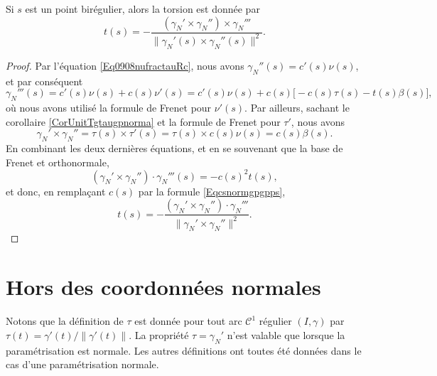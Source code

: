 \begin{proposition}
    Si $s$ est un point birégulier, alors la torsion est donnée par
    \begin{equation}
        t(s)=-\frac{ (\gamma_N'\times \gamma_N'')\times \gamma_N''' }{ \| \gamma_N'(s)\times \gamma_N''(s) \|^2 }.
    \end{equation}
\end{proposition}

\begin{proof}
    Par l'équation \eqref{Eq0908nufractauRc}, nous avons $\gamma_N''(s)=c'(s)\nu(s)$, et par conséquent
    \begin{equation}
        \gamma_N'''(s)=c'(s)\nu(s)+c(s)\nu'(s)=c'(s)\nu(s)+c(s)\big[ -c(s)\tau(s)-t(s)\beta(s) \big],
    \end{equation}
    où nous avons utilisé la formule de Frenet pour $\nu'(s)$. Par ailleurs, sachant le corollaire \ref{CorUnitTgtaugpnorma} et la formule de Frenet pour $\tau'$, nous avons
    \begin{equation}
        \gamma_N'\times \gamma_N''=\tau(s)\times \tau'(s)=\tau(s)\times c(s)\nu(s)=c(s)\beta(s).
    \end{equation}
    En combinant les deux dernières équations, et en se souvenant que la base de Frenet et orthonormale,
    \begin{equation}
        (\gamma_N'\times \gamma_N'')\cdot \gamma_N'''(s)=-c(s)^2t(s),
    \end{equation}
    et donc, en remplaçant $c(s)$ par la formule \eqref{Eqcsnormgpgpps},
    \begin{equation}
        t(s)=-\frac{  (\gamma_N'\times \gamma_N'')\cdot \gamma_N'''   }{ \| \gamma_N'\times \gamma_N'' \|^2 }.
    \end{equation}
\end{proof}

\section{Hors des coordonnées normales}

\begin{remark}      \label{Remfougnormoupad}
    Notons que la définition de $\tau$ est donnée pour tout arc $\mathcal{C}^1$ régulier $(I,\gamma)$ par $\tau(t)=\gamma'(t)/\| \gamma'(t) \|$. La propriété $\tau=\gamma_N'$ n'est valable que lorsque la paramétrisation est normale. Les autres définitions ont toutes été données dans le cas d'une paramétrisation normale.
\end{remark}

